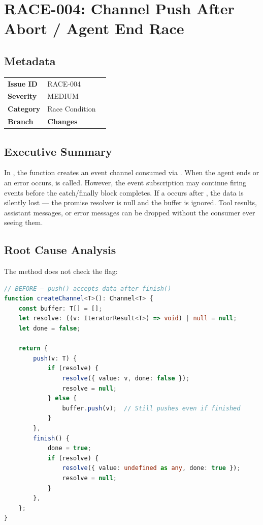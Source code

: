 \section{RACE-004: Channel Push After Abort / Agent End Race}
\label{sec:race-004}
\subsection*{Metadata}
\begin{tabular}{ll}
\textbf{Issue ID} & RACE-004 \\
\textbf{Severity} & MEDIUM \\
\textbf{Category} & Race Condition \\
\textbf{Branch} & 
\textbf{Changes} &  \\
\end{tabular}

\subsection*{Executive Summary}
In , the  function creates an event channel consumed via . When the agent ends or an error occurs,  is called. However, the event subscription may continue firing events before the catch/finally block completes. If a  occurs after , the data is silently lost — the promise resolver is null and the buffer is ignored. Tool results, assistant messages, or error messages can be dropped without the consumer ever seeing them.

\subsection*{Root Cause Analysis}
The  method does not check the  flag:

\begin{lstlisting}[language=TypeScript]
// BEFORE — push() accepts data after finish()
function createChannel<T>(): Channel<T> {
    const buffer: T[] = [];
    let resolve: ((v: IteratorResult<T>) => void) | null = null;
    let done = false;

    return {
        push(v: T) {
            if (resolve) {
                resolve({ value: v, done: false });
                resolve = null;
            } else {
                buffer.push(v);  // Still pushes even if finished
            }
        },
        finish() {
            done = true;
            if (resolve) {
                resolve({ value: undefined as any, done: true });
                resolve = null;
            }
        },
    };
}
\end{lstlisting}

